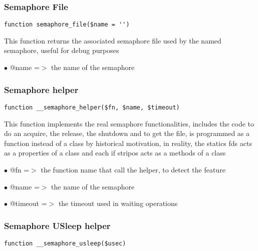 \documentclass[a4paper]{article}
\begin{document}
\hypertarget{toc206}{}
\subsubsection{Semaphore File}

\begin{lstlisting}
function semaphore_file($name = '')
\end{lstlisting}

This function returns the associated semaphore file used by the
named semaphore, useful for debug purposes

\begin{compactitem}
\item[\color{myblue}$\bullet$] @name =$>$ the name of the semaphore
\end{compactitem}

\hypertarget{toc207}{}
\subsubsection{Semaphore helper}

\begin{lstlisting}
function __semaphore_helper($fn, $name, $timeout)
\end{lstlisting}

This function implements the real semaphore functionalities, includes
the code to do an acquire, the release, the shutdown and to get the
file, is programmed as a function instead of a class by historical
motivation, in reality, the statics fds acts as a properties of a
class and each if stripos acts as a methods of a class

\begin{compactitem}
\item[\color{myblue}$\bullet$] @fn      =$>$ the function name that call the helper, to detect the feature
\item[\color{myblue}$\bullet$] @name    =$>$ the name of the semaphore
\item[\color{myblue}$\bullet$] @timeout =$>$ the timeout used in waiting operations
\end{compactitem}

\hypertarget{toc208}{}
\subsubsection{Semaphore USleep helper}

\begin{lstlisting}
function __semaphore_usleep($usec)
\end{lstlisting}
\end{document}
